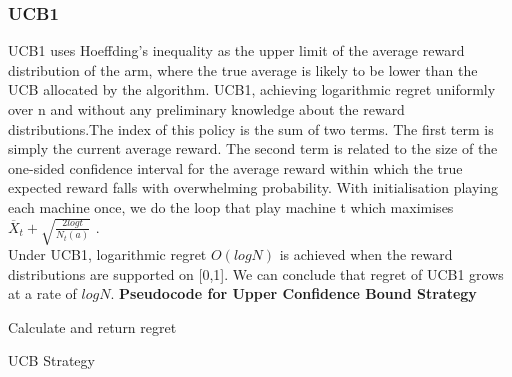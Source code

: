 \subsubsection{UCB1}
UCB1 uses Hoeffding's inequality as the upper limit of the average reward distribution of the arm, where the true average is likely to be lower than the UCB allocated by the algorithm.
UCB1, achieving logarithmic regret uniformly over n and without any preliminary knowledge about the reward distributions.The index of this policy is the sum of two terms. The first term is simply the current average reward. The second term is related to the size of the one-sided confidence interval for the average reward within which the true expected reward falls with overwhelming probability. With initialisation playing each machine once, we do the loop that play machine t which maximises $\overline X_t + \sqrt{\frac{2log t}{N_t (a)}}$ . \citep{Auer2002}
\\Under UCB1, logarithmic regret $O(logN)$  is achieved when the reward distributions are supported on [0,1].  \citep{Chan_2020} We can conclude that regret of UCB1 grows at a rate of $log N$.
\newline
\textbf{Pseudocode for Upper Confidence Bound Strategy}
\newline
\begin{algorithm}[H]
    Calculate and return regret
    \caption{UCB Strategy}
\end{algorithm}

